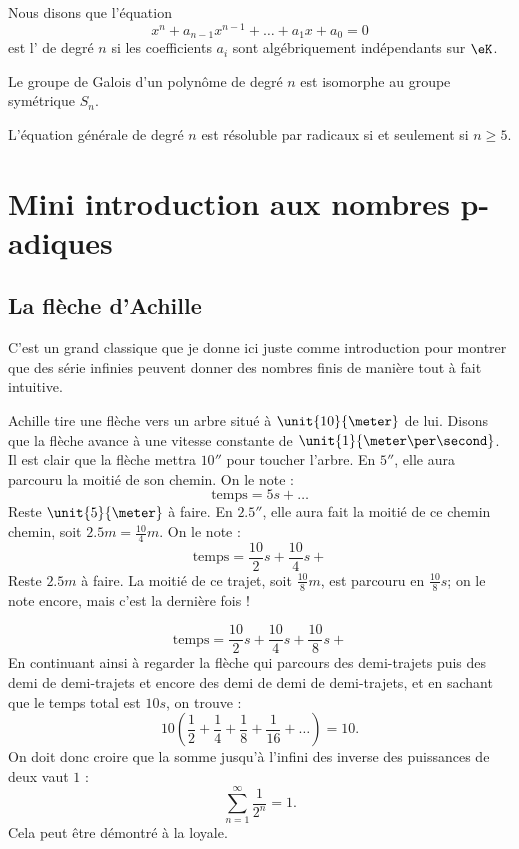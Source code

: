 Nous disons que l'équation
\begin{equation}
    x^n+a_{n-1}x^{n-1}+\ldots+a_1x+a_0=0
\end{equation}
est l' de degré \( n\) si les coefficients \( a_i\) sont algébriquement indépendants sur \( \eK\).

\begin{theorem}
    Le groupe de Galois d'un polynôme de degré \( n\) est isomorphe au groupe symétrique \( S_n\).
\end{theorem}

\begin{corollary}
    L'équation générale de degré \( n\) est résoluble par radicaux si et seulement si \( n\geq 5\).
\end{corollary}

\section{Mini introduction aux nombres \texorpdfstring{p}{$p$}-adiques}


\subsection{La flèche d'Achille}\label{s:un}

C'est un grand classique que je donne ici juste comme introduction pour montrer que des série infinies peuvent donner des nombres finis de manière tout à fait intuitive.

Achille tire une flèche vers un arbre situé à $\unit{10}{\meter}$ de lui. Disons que la flèche avance à une vitesse constante de $\unit{1}{\meter\per\second}$. Il est clair que la flèche mettra $\unit{10}{\second}$ pour toucher l'arbre. En $\unit{5}{\second}$, elle aura parcouru la moitié de son chemin. On le note :
\[
\text{temps}=5s+\ldots
\]
Reste \( \unit{5}{\meter}\) à faire. En $\unit{2.5}{\second}$, elle aura fait la moitié de ce chemin chemin, soit $2.5m=\frac{10}{4}m$. On le note :
\[
\text{temps}=\frac{10}{2}s+\frac{10}{4}s+
\]
Reste $2.5m$ à faire. La moitié de ce trajet, soit $\frac{10}{8}m$, est parcouru en $\frac{10}{8}s$; on le note encore, mais c'est la dernière fois !

\[
\text{temps}=\frac{10}{2}s+\frac{10}{4}s+\frac{10}{8}s+
\]
En continuant ainsi à regarder la flèche qui parcours des demi-trajets puis des demi de demi-trajets et encore des demi de demi de demi-trajets, et en sachant que le temps total est $10s$, on trouve :
\[
10\left( \frac{1}{2}+\frac{1}{4}+\frac{1}{8}+\frac{1}{16}+\ldots  \right)=10.
\]
On doit donc croire que la somme jusqu'à l'infini des inverse des puissances de deux vaut $1$ :
\[
   \sum_{n=1}^{\infty}\frac{1}{2^n}=1.
\]
Cela peut être démontré à la loyale.


